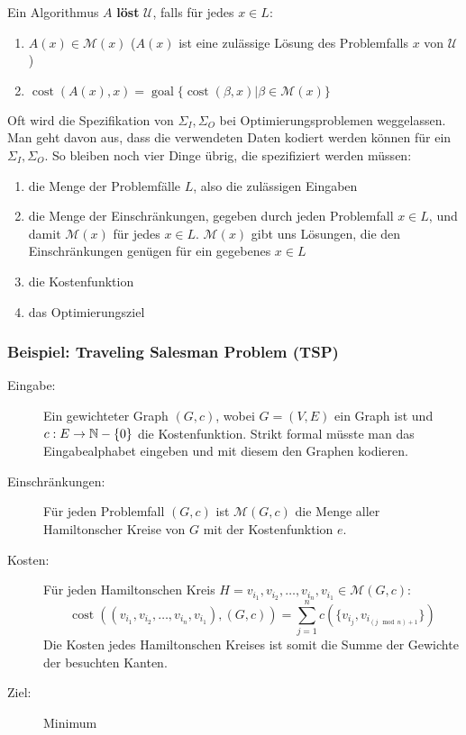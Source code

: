 \begin{definition}
Ein Algorithmus $A$ \textbf{löst} $\mathcal{U}$, falls für jedes $x \in L$:
\begin{enumerate}
  \item $A(x) \in \mathcal{M}(x)$ ($A(x)$ ist eine zulässige Lösung des Problemfalls $x$ von $\mathcal{U}$)
  \item $\operatorname{cost}(A(x), x) = \operatorname{goal}\{\operatorname{cost}(\beta, x) | \beta \in \mathcal{M}(x)\}$
\end{enumerate}
\end{definition}

\begin{remark}
Oft wird die Spezifikation von $\Sigma_I, \Sigma_O$ bei Optimierungsproblemen weggelassen. Man geht davon aus, dass die verwendeten Daten kodiert werden können für ein $\Sigma_I, \Sigma_O$. So bleiben noch vier Dinge übrig, die spezifiziert werden müssen:
\begin{enumerate}
  \item die Menge der Problemfälle $L$, also die zulässigen Eingaben
  \item die Menge der Einschränkungen, gegeben durch jeden Problemfall $x \in L$, und damit $\mathcal{M}(x)$ für jedes $x \in L$. $\mathcal{M}(x)$ gibt uns Lösungen, die den Einschränkungen genügen für ein gegebenes $x \in L$
  \item die Kostenfunktion
  \item das Optimierungsziel
\end{enumerate}

\end{remark}

\subsubsection{Beispiel: Traveling Salesman Problem (TSP)}
\begin{description}
  \item[Eingabe:] Ein gewichteter Graph $(G, c)$, wobei $G = (V, E)$ ein Graph ist und $c: E \to \mathbb{N} - \{0\}$ die Kostenfunktion. Strikt formal müsste man das Eingabealphabet eingeben und mit diesem den Graphen kodieren.
  \item[Einschränkungen:] Für jeden Problemfall $(G, c)$ ist $\mathcal{M}(G, c)$ die Menge aller Hamiltonscher Kreise von $G$ mit der Kostenfunktion $e$.
  \item[Kosten:] Für jeden Hamiltonschen Kreis $H = v_{i_1}, v_{i_2}, \ldots, v_{i_n}, v_{i_1} \in \mathcal{M}(G, c)$:
    \[
    \operatorname{cost}((v_{i_1}, v_{i_2}, \ldots, v_{i_n}, v_{i_1}), (G, c)) = \sum_{j = 1}^n c \left (\{v_{i_j}, v_{i_{(j \mod n) + 1}}\} \right )
    \]
    Die Kosten jedes Hamiltonschen Kreises ist somit die Summe der Gewichte der besuchten Kanten.
  \item[Ziel:] Minimum\\
\end{description}

